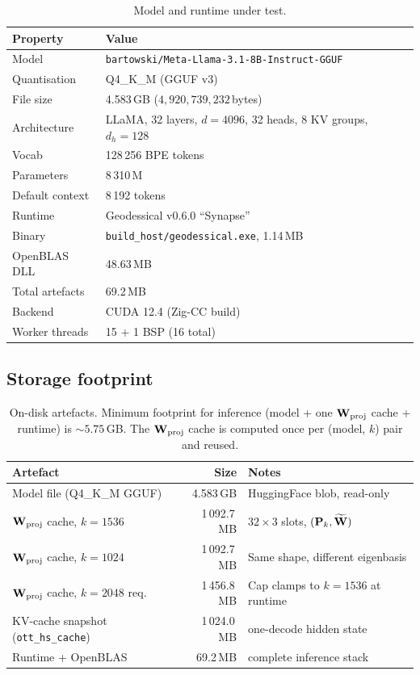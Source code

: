 \documentclass[11pt]{article}
\begin{document}
\begin{table}[h]\centering\footnotesize
\caption{Model and runtime under test.}
\begin{tabular}{@{}ll@{}}
\toprule
\textbf{Property} & \textbf{Value}\\
\midrule
Model               & \texttt{bartowski/Meta-Llama-3.1-8B-Instruct-GGUF}\\
Quantisation        & Q4\_K\_M (GGUF v3)\\
File size           & 4.583\,GB ($4{,}920{,}739{,}232$\,bytes)\\
Architecture        & LLaMA, 32 layers, $d{=}4096$, 32 heads, 8 KV groups, $d_h{=}128$\\
Vocab               & 128\,256 BPE tokens\\
Parameters          & 8\,310\,M\\
Default context     & 8\,192 tokens\\
\midrule
Runtime             & Geodessical v0.6.0 ``Synapse''\\
Binary              & \texttt{build\_host/geodessical.exe}, 1.14\,MB\\
OpenBLAS DLL        & 48.63\,MB\\
Total artefacts     & 69.2\,MB\\
Backend             & CUDA 12.4 (Zig-CC build)\\
Worker threads      & 15 + 1 BSP (16 total)\\
\bottomrule
\end{tabular}
\end{table}

\subsection{Storage footprint}

\begin{table}[h]\centering\footnotesize
\caption{On-disk artefacts. Minimum footprint for inference (model + one
$\mathbf{W}_\text{proj}$ cache + runtime) is ${\sim}5.75$\,GB. The
$\mathbf{W}_\text{proj}$ cache is computed once per (model, $k$) pair and reused.}
\begin{tabular}{@{}lrl@{}}
\toprule
\textbf{Artefact} & \textbf{Size} & \textbf{Notes}\\
\midrule
Model file (Q4\_K\_M GGUF)                  & 4.583\,GB   & HuggingFace blob, read-only\\
$\mathbf{W}_\text{proj}$ cache, $k{=}1536$       & 1\,092.7\,MB & $32{\times}3$ slots, $(\mathbf{P}_k,\widetilde{\mathbf{W}})$\\
$\mathbf{W}_\text{proj}$ cache, $k{=}1024$       & 1\,092.7\,MB & Same shape, different eigenbasis\\
$\mathbf{W}_\text{proj}$ cache, $k{=}2048$ req.\ & 1\,456.8\,MB & Cap clamps to $k{=}1536$ at runtime\\
KV-cache snapshot (\texttt{ott\_hs\_cache}) & 1\,024.0\,MB & one-decode hidden state\\
Runtime + OpenBLAS                          & 69.2\,MB     & complete inference stack\\
\bottomrule
\end{tabular}
\end{table}
\end{document}
